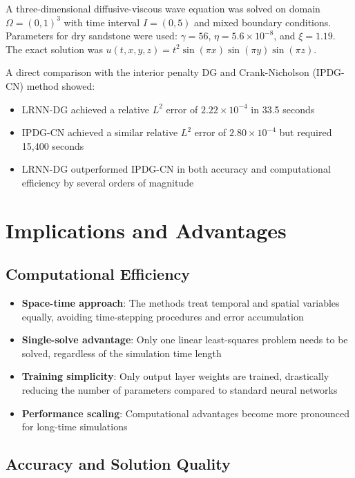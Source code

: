 \documentclass[11pt,a4paper]{article}
\begin{document}
A three-dimensional diffusive-viscous wave equation was solved on domain $\Omega = (0,1)^3$ with time interval $I = (0,5)$ and mixed boundary conditions. Parameters for dry sandstone were used: $\gamma = 56$, $\eta = 5.6 \times 10^{-8}$, and $\xi = 1.19$. The exact solution was $u(t,x,y,z) = t^2 \sin(\pi x) \sin(\pi y) \sin(\pi z)$.

A direct comparison with the interior penalty DG and Crank-Nicholson (IPDG-CN) method showed:
\begin{itemize}
    \item LRNN-DG achieved a relative $L^2$ error of $2.22 \times 10^{-4}$ in 33.5 seconds
    \item IPDG-CN achieved a similar relative $L^2$ error of $2.80 \times 10^{-4}$ but required 15,400 seconds
    \item LRNN-DG outperformed IPDG-CN in both accuracy and computational efficiency by several orders of magnitude
\end{itemize}

\section{Implications and Advantages}

\subsection{Computational Efficiency}

\begin{itemize}
    \item \textbf{Space-time approach}: The methods treat temporal and spatial variables equally, avoiding time-stepping procedures and error accumulation
    \item \textbf{Single-solve advantage}: Only one linear least-squares problem needs to be solved, regardless of the simulation time length
    \item \textbf{Training simplicity}: Only output layer weights are trained, drastically reducing the number of parameters compared to standard neural networks
    \item \textbf{Performance scaling}: Computational advantages become more pronounced for long-time simulations
\end{itemize}

\subsection{Accuracy and Solution Quality}
\end{document}
